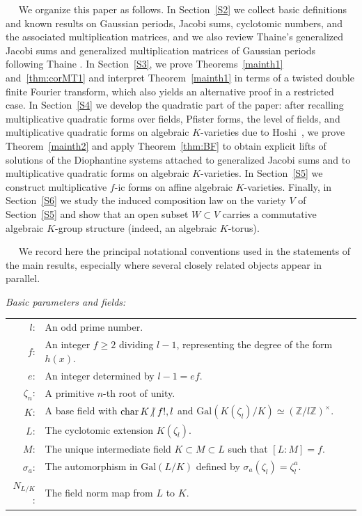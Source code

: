\documentclass[a4paper, 11pt]{amsart}
\newcommand{\notmid}{\mathrel{\ooalign{$\mkern-5mu\not$\crcr$|$}}}
\theoremstyle{plain}
\theoremstyle{definition}
\numberwithin{equation}{section}
\begin{document}
\medskip
\medskip
{}~~
We organize this paper as follows.
In Section~\ref{S2} we collect basic definitions and known results on Gaussian periods, Jacobi sums, cyclotomic numbers, and the associated multiplication matrices, and we also review Thaine's generalized Jacobi sums and generalized multiplication matrices of Gaussian periods following Thaine \cite{Tha04}.
In Section~\ref{S3}, we prove Theorems~\ref{mainth1} and~\ref{thm:corMT1} and interpret Theorem~\ref{mainth1} in terms of a twisted double finite Fourier transform, which also yields an alternative proof in a restricted case.
In Section~\ref{S4} we develop the quadratic part of the paper: 
after recalling multiplicative quadratic forms over fields, Pfister forms, the level of fields,
and multiplicative quadratic forms on algebraic $K$-varieties due to Hoshi~\cite{Hos03}, 
we prove Theorem~\ref{mainth2} and apply Theorem~\ref{thm:BF} to obtain explicit lifts of solutions of the Diophantine systems attached to generalized Jacobi sums and to multiplicative quadratic forms on algebraic $K$-varieties.
In Section~\ref{S5} we construct multiplicative $f$-ic forms on affine algebraic $K$-varieties.
Finally, in Section~\ref{S6} we study the induced composition law on the variety $V$ of Section~\ref{S5} and show that an open subset $W\subset V$ carries a commutative algebraic $K$-group structure (indeed, an algebraic  $K$-torus).

\medskip
\medskip
{}~~
We record here the principal notational conventions used in the statements of the main results, especially where several closely related objects appear in parallel.

\medskip
\textit{Basic parameters and fields:}
\par\smallskip
\begin{tabular}{@{} r @{\quad} l}
 $l$: & An odd prime number. \\
 $f$: & An integer $f \ge 2$ dividing $l-1$, representing the degree of the form $h(x)$. \\
 $e$: & An integer determined by $l-1 = ef$. \\
 $\zeta_n$: & A primitive $n$-th root of unity. \\
 $K$: & A base field with $\text{char}\, K \notmid f!, l$ and $\text{Gal}(K(\zeta_l)/K) \simeq (\mathbb{Z}/l\mathbb{Z})^\times$. \\
 $L$: & The cyclotomic extension $K(\zeta_l)$. \\
 $M$: & The unique intermediate field $K \subset M \subset L$ such that $[L:M]=f$.\\
 $\sigma_a$: & The automorphism in $\text{Gal}(L/K)$ defined by $\sigma_a(\zeta_l) = \zeta_l^a$. \\
 $N_{L/K}$: & The field norm map from $L$ to $K$. \\
\end{tabular}
\end{document}
